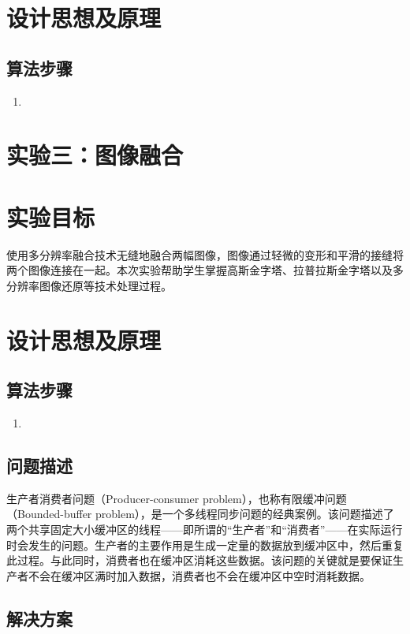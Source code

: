 \documentclass[withoutpreface,bwprint]{cumcmthesis} %
\begin{document}
\section{设计思想及原理}


\subsection{算法步骤}
\begin{enumerate}[itemindent=2em]  %
    \item 
\end{enumerate}

\newpage

\section*{\LARGE 实验三：图像融合}
\section{实验目标}
使用多分辨率融合技术无缝地融合两幅图像，图像通过轻微的变形和平滑的接缝将两个图像连接在一起。本次实验帮助学生掌握高斯金字塔、拉普拉斯金字塔以及多分辨率图像还原等技术处理过程。
\section{设计思想及原理}


\subsection{算法步骤}
\begin{enumerate}[itemindent=2em]  %
    \item 
\end{enumerate}


\subsection{问题描述}

生产者消费者问题（Producer-consumer problem），也称有限缓冲问题（Bounded-buffer problem），是一个多线程同步问题的经典案例。该问题描述了两个共享固定大小缓冲区的线程——即所谓的“生产者”和“消费者”——在实际运行时会发生的问题。生产者的主要作用是生成一定量的数据放到缓冲区中，然后重复此过程。与此同时，消费者也在缓冲区消耗这些数据。该问题的关键就是要保证生产者不会在缓冲区满时加入数据，消费者也不会在缓冲区中空时消耗数据。

\subsection{解决方案}
\end{document}
